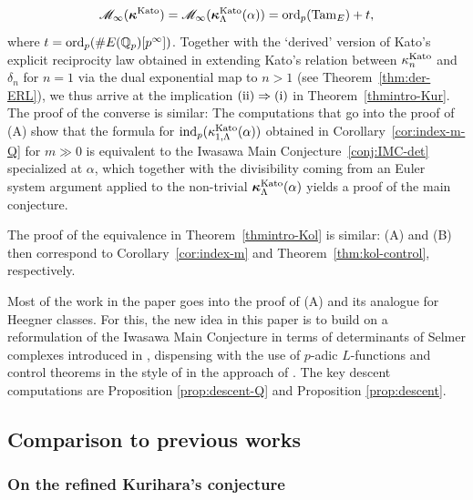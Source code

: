 \documentclass[10pt,reqno]{amsart}
\numberwithin{equation}{section}
\theoremstyle{plain}
\theoremstyle{definition}
\theoremstyle{definition}
\theoremstyle{plain}
\theoremstyle{plain}
\theoremstyle{plain}
\theoremstyle{plain}
\theoremstyle{plain}
\theoremstyle{plain}
\newcommand{\Q}{\mathbb{Q}}
\begin{document}
\[
\mathscr{M}_\infty(\boldsymbol{\kappa}^{\rm Kato})=
\mathscr{M}_\infty(\boldsymbol{\kappa}_{\Lambda}^{\rm Kato}(\alpha))={\rm ord}_p({\rm Tam}_E)+t,
\]
where $t={\rm ord}_p(\#E(\Q_p)[p^\infty])$. Together with the `derived' version of Kato's explicit reciprocity law obtained in \cite{kim} extending Kato's relation between $\kappa_n^{\rm Kato}$ and $\delta_n$ for $n=1$ via the dual exponential map to $n>1$ (see Theorem~\ref{thm:der-ERL}), we thus arrive at the implication ${\rm (ii)}\Rightarrow{\rm (i)}$ in Theorem~\ref{thmintro-Kur}. The proof of the converse is similar: The computations that go into the proof of (A) show that the formula for ${\rm ind}_p(\kappa_{1,\Lambda}^{\rm Kato}(\alpha))$ obtained in Corollary~\ref{cor:index-m-Q} for $m\gg 0$ is equivalent to the Iwasawa Main Conjecture~\ref{conj:IMC-det} specialized at $\alpha$, which together with the divisibility coming from an Euler system argument applied to the non-trivial $\boldsymbol{\kappa}_\Lambda^{\rm Kato}(\alpha)$ yields a proof of the main conjecture. 

The proof of the equivalence in Theorem~\ref{thmintro-Kol} is similar: (A) and (B) then correspond to Corollary~\ref{cor:index-m}  and Theorem~\ref{thm:kol-control}, respectively.  

Most of the work in the paper goes into the proof of (A)  and its analogue for Heegner classes. For this, the new idea in this paper is to build on a reformulation of the Iwasawa Main Conjecture in terms of determinants of Selmer complexes introduced in \cite{kataoka-sano}, 
dispensing with the use of $p$-adic $L$-functions  and control theorems in the style of \cite{greenberg-cetraro} in the approach of \cite{BCGS}. The key descent computations are Proposition \ref{prop:descent-Q} and Proposition \ref{prop:descent}.

\subsection{Comparison to previous works}

\subsubsection{On the refined Kurihara's conjecture}
\end{document}
